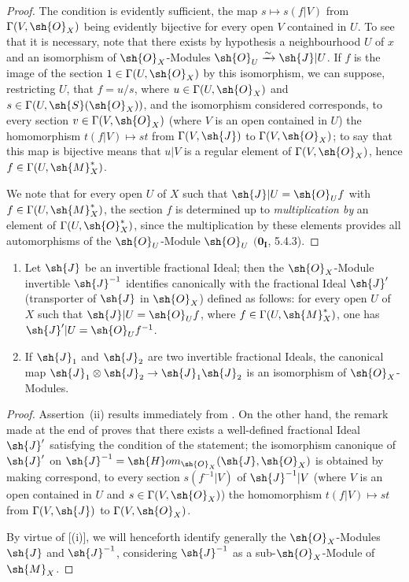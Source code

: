 \begin{proof}
The condition is evidently sufficient, the map $s\mapsto s(f|V)$ from $\Gamma(V,\sh{O}_X)$ being evidently bijective for every open $V$ contained in $U$.
To see that it is necessary, note that there exists by hypothesis a neighbourhood $U$ of $x$ and an isomorphism of $\sh{O}_X$-Modules $\sh{O}_U\xrightarrow{\sim}\sh{J}|U$.
If $f$ is the image of the section $1\in\Gamma(U,\sh{O}_X)$ by this isomorphism, we can suppose, restricting $U$, that $f=u/s$, where $u\in\Gamma(U,\sh{O}_X)$ and $s\in\Gamma(U,\sh{S}(\sh{O}_X))$, and the isomorphism considered corresponds, to every section $v\in\Gamma(V,\sh{O}_X)$ (where $V$ is an open contained in $U$) the homomorphism $t(f|V)\mapsto st$ from $\Gamma(V,\sh{J})$ to $\Gamma(V,\sh{O}_X)$;
to say that this map is bijective means that $u|V$ is a regular element of $\Gamma(V,\sh{O}_X)$, hence $f\in\Gamma(U,\sh{M}_X^*)$.

We note that for every open $U$ of $X$ such that $\sh{J}|U=\sh{O}_U f$ with $f\in\Gamma(U,\sh{M}_X^*)$, the section $f$ is determined up to \emph{multiplication by} an element of $\Gamma(U,\sh{O}_X^*)$, since the multiplication by these elements provides all automorphisms of the $\sh{O}_U$-Module $\sh{O}_U$ $(\mathbf{0_I}$, 5.4.3).
\end{proof}

\begin{corollary}[21.2.3]
\label{IV.21.2.3}
\begin{enumerate}[label=\emph{(\roman*)}]
  \item Let $\sh{J}$ be an invertible fractional Ideal;
  then the $\sh{O}_X$-Module invertible $\sh{J}^{-1}$ identifies canonically with the fractional Ideal $\sh{J}'$ (transporter of $\sh{J}$ in $\sh{O}_X$) defined as follows:
  for every open $U$ of $X$ such that $\sh{J}|U=\sh{O}_U f$, where $f\in\Gamma(U,\sh{M}_X^*)$, one has $\sh{J}'|U=\sh{O}_U f^{-1}$.
  \item If $\sh{J}_1$ and $\sh{J}_2$ are two invertible fractional Ideals, the canonical map $\sh{J}_1\otimes\sh{J}_2\to\sh{J}_1\sh{J}_2$ is an isomorphism of $\sh{O}_X$-Modules.
\end{enumerate}
\end{corollary}

\begin{proof}
Assertion~(ii) results immediately from .
On the other hand, the remark made at the end of  proves that there exists a well-defined fractional Ideal $\sh{J}'$ satisfying the condition of the statement;
the isomorphism canonique of $\sh{J}'$ on $\sh{J}^{-1}=\sh{H}om_{\sh{O}_X}(\sh{J},\sh{O}_X)$ is obtained by making correspond, to every section $s(f^{-1}|V)$ of $\sh{J}^{-1}|V$ (where $V$ is an open contained in $U$ and $s\in\Gamma(V,\sh{O}_X)$) the homomorphism $t(f|V)\mapsto st$ from $\Gamma(V,\sh{J})$ to $\Gamma(V,\sh{O}_X)$.

By virtue of [(i)], we will henceforth identify generally the $\sh{O}_X$-Modules $\sh{J}$ and $\sh{J}^{-1}$, considering $\sh{J}^{-1}$ as a sub-$\sh{O}_X$-Module of $\sh{M}_X$.
\end{proof}

